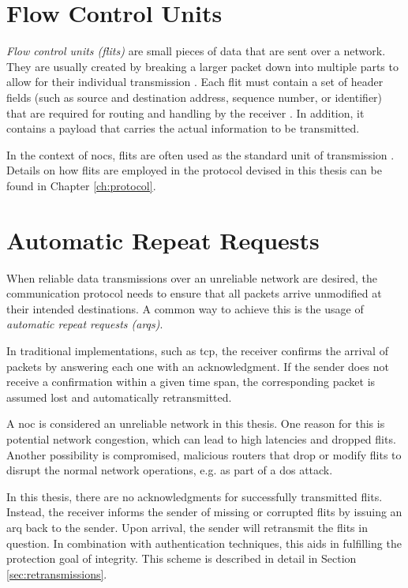 %
\section{Flow Control Units}\label{sec:flits}
\textit{Flow control units (flits)} are small pieces of data that are sent over a network. They are usually created by breaking a larger
packet down into multiple parts to allow for their individual transmission \cite[6]{flitslecturecmu}. Each flit must contain a set of header fields (such as source and
destination address, sequence number, or identifier) that are required for routing and handling by the receiver \cite[2]{flitslectureutah}.
In addition, it contains a payload that carries the actual information to be transmitted.

In the context of \glspl{noc}, flits are often used as the standard unit of transmission \cite[51\psqq]{tatas16designingnocs}. Details on how flits
are employed in the protocol devised in this thesis can be found in Chapter \ref{ch:protocol}.

\section{Automatic Repeat Requests}\label{sec:arqs}
When reliable data transmissions over an unreliable network are desired, the communication protocol needs to ensure that all packets arrive unmodified
at their intended destinations. A common way to achieve this is the usage of \textit{automatic repeat requests (\glspl{arq})}.

In traditional implementations, such as \gls{tcp}, the receiver confirms the arrival of packets by answering each one with an acknowledgment.
If the sender does not receive a confirmation within a given time span, the corresponding packet is assumed lost and automatically retransmitted.

A \gls{noc} is considered an unreliable network in this thesis. One reason for this is potential network congestion, which can lead to high latencies
and dropped flits. Another possibility is compromised, malicious routers that drop or modify flits to disrupt the normal network operations, e.g. as part of a
\gls{dos} attack.

In this thesis, there are no acknowledgments for successfully transmitted flits. Instead, the receiver informs the sender of missing or corrupted
flits by issuing an \gls{arq} back to the sender. Upon arrival, the sender will retransmit the flits in question. In combination with
authentication techniques, this aids in fulfilling the protection goal of integrity. This scheme is described in detail in Section
\ref{sec:retransmissions}.

